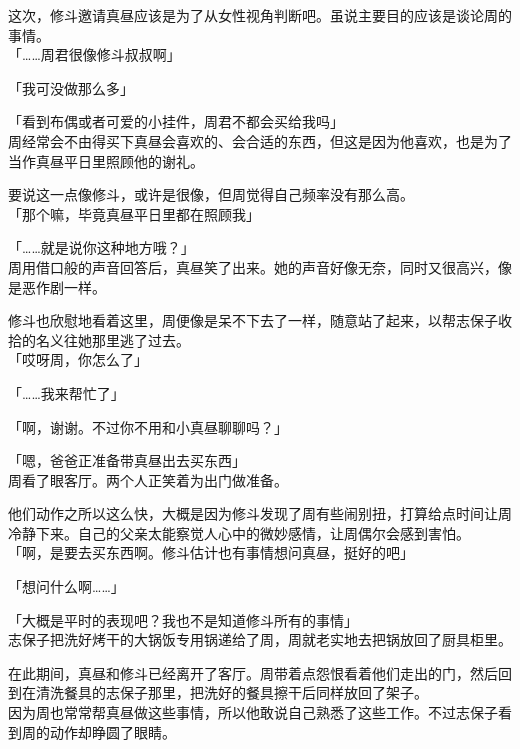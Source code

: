 这次，修斗邀请真昼应该是为了从女性视角判断吧。虽说主要目的应该是谈论周的事情。\\

「……周君很像修斗叔叔啊」

「我可没做那么多」

「看到布偶或者可爱的小挂件，周君不都会买给我吗」\\

周经常会不由得买下真昼会喜欢的、会合适的东西，但这是因为他喜欢，也是为了当作真昼平日里照顾他的谢礼。

要说这一点像修斗，或许是很像，但周觉得自己频率没有那么高。\\

「那个嘛，毕竟真昼平日里都在照顾我」

「……就是说你这种地方哦？」\\

周用借口般的声音回答后，真昼笑了出来。她的声音好像无奈，同时又很高兴，像是恶作剧一样。

修斗也欣慰地看着这里，周便像是呆不下去了一样，随意站了起来，以帮志保子收拾的名义往她那里逃了过去。\\

「哎呀周，你怎么了」

「……我来帮忙了」

「啊，谢谢。不过你不用和小真昼聊聊吗？」

「嗯，爸爸正准备带真昼出去买东西」\\

周看了眼客厅。两个人正笑着为出门做准备。

他们动作之所以这么快，大概是因为修斗发现了周有些闹别扭，打算给点时间让周冷静下来。自己的父亲太能察觉人心中的微妙感情，让周偶尔会感到害怕。\\

「啊，是要去买东西啊。修斗估计也有事情想问真昼，挺好的吧」

「想问什么啊……」

「大概是平时的表现吧？我也不是知道修斗所有的事情」\\

志保子把洗好烤干的大锅饭专用锅递给了周，周就老实地去把锅放回了厨具柜里。

在此期间，真昼和修斗已经离开了客厅。周带着点怨恨看着他们走出的门，然后回到在清洗餐具的志保子那里，把洗好的餐具擦干后同样放回了架子。\\

因为周也常常帮真昼做这些事情，所以他敢说自己熟悉了这些工作。不过志保子看到周的动作却睁圆了眼睛。\\

